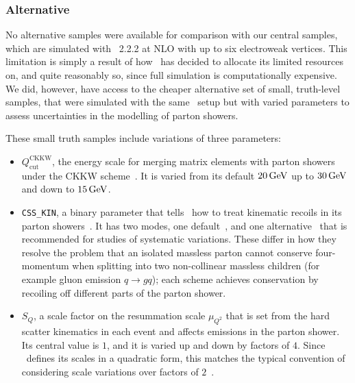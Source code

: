 \subsubsection{Alternative \diboson}
\label{sec:2ljets_diboson_alt}
No alternative samples were available for comparison with our central \diboson
samples, which are simulated with \sherpa~2.2.2 at NLO with up to six
electroweak vertices.
This limitation is simply a result of how \atlas\ has decided to allocate
its limited resources on, and quite reasonably so, since full simulation is
computationally expensive.
We did, however, have access to the cheaper alternative set of small,
truth-level samples, that were simulated with the same \sherpa\ setup but with
varied parameters to assess uncertainties in the modelling of parton showers.

These small truth samples include variations of three parameters:
\begin{itemize}
\item $Q_\textrm{cut}^\textrm{CKKW}$, the energy scale for merging
matrix elements with parton showers under the CKKW
scheme~\cite{Catani_2001_CKKW,Hoeche:2009rj}.
It is varied from its default $20\,\eV[G]$ up to $30\,\eV[G]$ and down
to $15\,\eV[G]$.
\item \texttt{CSS\_KIN}, a binary parameter that tells \sherpa\ how to treat
kinematic recoils in its parton showers~\cite{sherpa_222_manual}.
It has two modes, one default~\cite{Hoeche:2009rj}, and one
alternative~\cite{Hoeche:2009xc}
that is recommended for studies of systematic variations.
These differ in how they resolve the problem that an isolated massless parton
cannot conserve four-momentum when splitting into two non-collinear massless
children (for example gluon emission $q\rightarrow gq$);
each scheme achieves conservation by recoiling off different parts of the
parton shower.
\item $S_Q$, a scale factor on the resummation scale $\mu_{Q^2}$ that is set
from the hard scatter kinematics in each event and affects emissions in the
parton shower.
Its central value is $1$, and it is varied up and down by factors of $4$.
Since \sherpa\ defines its scales in a quadratic form, this matches the typical
convention of considering scale variations over factors of
$2$~\cite{sherpa_222_manual,Bothmann:2019yzt}.
\end{itemize}
